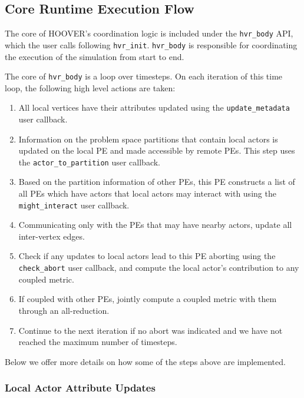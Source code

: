 \subsection{Core Runtime Execution Flow}

The core of HOOVER's coordination logic is included under the \texttt{hvr\_body}
API, which the user calls following \texttt{hvr\_init}. \texttt{hvr\_body} is
responsible for coordinating the execution of the simulation from start to end.

The core of \texttt{hvr\_body} is a loop over timesteps. On each iteration of
this time loop, the following high level actions are taken:

\begin{enumerate}
    \item All local vertices have their attributes updated using the
        \texttt{update\_metadata} user callback.
    \item Information on the problem space partitions that contain local actors
        is updated on the local PE and made accessible by remote PEs. This step
        uses the \texttt{actor\_to\_partition} user callback.
    \item Based on the partition information of other PEs, this PE constructs a
        list of all PEs which have actors that local actors may interact with
        using the \texttt{might\_interact} user callback.
    \item Communicating only with the PEs that may have nearby actors, update
        all inter-vertex edges.
    \item Check if any updates to local actors lead to this PE aborting using
        the \texttt{check\_abort} user callback, and compute the local actor's
        contribution to any coupled metric.
    \item If coupled with other PEs, jointly compute a coupled metric with them
        through an all-reduction.
    \item Continue to the next iteration if no abort was indicated and we have
        not reached the maximum number of timesteps.
\end{enumerate}

Below we offer more details on how some of the steps above are implemented.

\subsubsection{Local Actor Attribute Updates}

